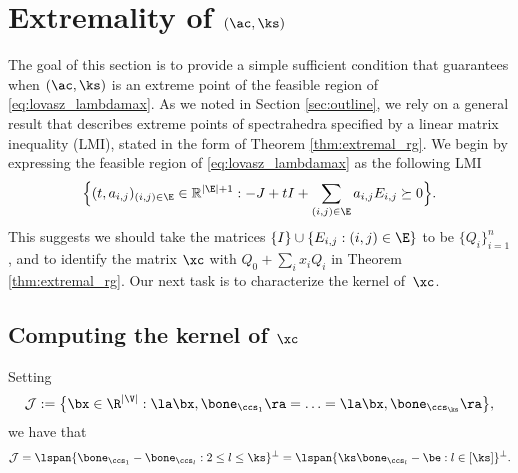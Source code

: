 \section{Extremality of $(\ac,\ks)$} \label{sec:extremality}


The goal of this section is to provide a simple sufficient condition that guarantees when $(\ac,\ks)$ is an extreme point of the feasible region of \eqref{eq:lovasz_lambdamax}.  %
 As we noted in Section \ref{sec:outline}, we rely  on a  general result that describes extreme points of spectrahedra specified by a linear matrix inequality (LMI), stated in the form of Theorem \ref{thm:extremal_rg}.  We begin by expressing the feasible region of \eqref{eq:lovasz_lambdamax} as the following LMI
$$
\Big \{  (t, a_{i,j})_{(i,j) \in \E} \in \mathbb{R}^{|\E|+1} : - J + t I + \sum_{(i,j) \in \E} a_{i,j} E_{i,j} \succeq 0 \Big \}.
$$
This suggests we should take the matrices $\{I\} \cup \{ E_{i,j} : (i,j) \in \E \}$ to be $\{Q_i\}_{i=1}^{n}$, and to identify the matrix $\xc$ with $Q_0 +\sum_i x_i Q_i$ in Theorem \ref{thm:extremal_rg}.  Our next task is to characterize the kernel of~$\xc$.



\subsection{Computing the kernel of $\xc$}


\begin{proposition}\label{thm:jspace} Setting 
$$
\mathcal{J}:=\big \{ \bx \in \R^{|\V|} : \la \bx, \bone_{\ccs_1} \ra = \ldots = \la \bx,  \bone_{\ccs_{\ks}}\ra \big\},
$$
 we have that
$$\mathcal{J} = \lspan\{\bone_{\ccs_1} - \bone_{\ccs_l}:  2\le l\le \ks \}^\perp = \lspan\{ \ks \bone_{\ccs_l} -\be: l\in [\ks]\}^\perp.$$
\end{proposition}

